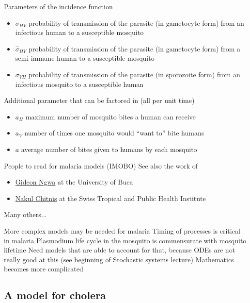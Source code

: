 \documentclass[aspectratio=169]{beamer}\usepackage[]{graphicx}\usepackage[]{xcolor}
\begin{document}
\begin{frame}{Parameters of the incidence function}
\begin{itemize}
\item $\sigma_{HV}$ probability of transmission of the parasite (in gametocyte form) from
an infectious human to a susceptible mosquito
\item $\hat\sigma_{HV}$ probability of transmission of the parasite (in gametocyte form) from
a semi-immune human to a susceptible mosquito
\item $\sigma_{VH}$ probability of transmission of the parasite (in sporozoite form) from
an infectious mosquito to a susceptible human
\end{itemize}
\vfill
Additional parameter that can be factored in (all per unit time)
\begin{itemize}
\item $a_H$ maximum number of mosquito bites a human can receive
\item $a_V$ number of times one mosquito would ``want to'' bite humans
\item $a$ average number of bites given to humans by each mosquito
\end{itemize}
\end{frame}

\begin{frame}{People to read for malaria models (IMOBO)}
See also the work of 
\vfill
\begin{itemize}
\item \href{https://scholar.google.com/citations?user=AwKMfZ8AAAAJ&hl=en}{Gideon Ngwa} at the University of Buea
\vfill
\item \href{https://scholar.google.ch/citations?user=BMiKO0UAAAAJ&hl=en}{Nakul Chitnis} at the Swiss Tropical and Public Health Institute
\end{itemize}
\vfill
Many others...
\end{frame}


\begin{frame}{More complex models may be needed for malaria}
Timing of processes is critical in malaria
\vfill
Plasmodium life cycle in the mosquito is commensurate with mosquito lifetime
\vfill
Need models that are able to account for that, because ODEs are not really good at this (see beginning of Stochastic systems lecture)
\vfill
Mathematics becomes more complicated
\end{frame}

\subsection{A model for cholera}
\end{document}
